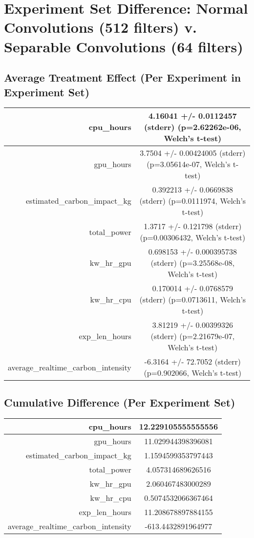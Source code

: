 \documentclass{article}%
\begin{document}
%
\normalsize%
\section{Experiment Set Difference: Normal Convolutions (512 filters) v. Separable Convolutions (64 filters)}%
\label{sec:Experiment Set Difference Normal Convolutions (512 filters) v. Separable Convolutions (64 filters)}%
\subsection{Average Treatment Effect (Per Experiment in Experiment Set)}%
\label{subsec:Average Treatment Effect (Per Experiment in Experiment Set)}%
\begin{tabular}{|r|c|}%
\hline%
cpu\_hours&4.16041 +/{-} 0.0112457 (stderr) (p=2.62262e{-}06, Welch's t{-}test)\\%
\hline%
gpu\_hours&3.7504 +/{-} 0.00424005 (stderr) (p=3.05614e{-}07, Welch's t{-}test)\\%
\hline%
estimated\_carbon\_impact\_kg&0.392213 +/{-} 0.0669838 (stderr) (p=0.0111974, Welch's t{-}test)\\%
\hline%
total\_power&1.3717 +/{-} 0.121798 (stderr) (p=0.00306432, Welch's t{-}test)\\%
\hline%
kw\_hr\_gpu&0.698153 +/{-} 0.000395738 (stderr) (p=3.25568e{-}08, Welch's t{-}test)\\%
\hline%
kw\_hr\_cpu&0.170014 +/{-} 0.0768579 (stderr) (p=0.0713611, Welch's t{-}test)\\%
\hline%
exp\_len\_hours&3.81219 +/{-} 0.00399326 (stderr) (p=2.21679e{-}07, Welch's t{-}test)\\%
\hline%
average\_realtime\_carbon\_intensity&{-}6.3164 +/{-} 72.7052 (stderr) (p=0.902066, Welch's t{-}test)\\%
\hline%
\end{tabular}

%
\subsection{Cumulative Difference (Per Experiment Set)}%
\label{subsec:Cumulative Difference (Per Experiment Set)}%
\begin{tabular}{|r|c|}%
\hline%
cpu\_hours&12.229105555555556\\%
\hline%
gpu\_hours&11.029944398396081\\%
\hline%
estimated\_carbon\_impact\_kg&1.1594599353797443\\%
\hline%
total\_power&4.057314689626516\\%
\hline%
kw\_hr\_gpu&2.060467483000289\\%
\hline%
kw\_hr\_cpu&0.5074532066367464\\%
\hline%
exp\_len\_hours&11.208678897884155\\%
\hline%
average\_realtime\_carbon\_intensity&{-}613.4432891964977\\%
\hline%
\end{tabular}

%
\end{document}
